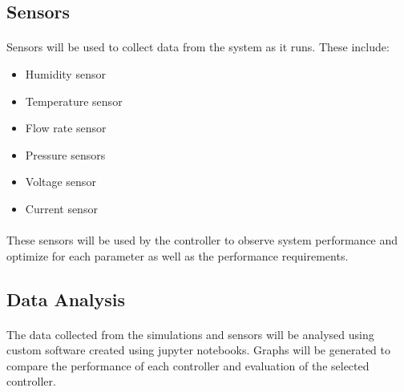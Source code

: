 \subsection{Sensors}
\paragraph{}Sensors will be used to collect data from the system as it runs. These include:
\begin{itemize}
\item Humidity sensor
\item Temperature sensor
\item Flow rate sensor
\item Pressure sensors
\item Voltage sensor
\item Current sensor
\end{itemize}
\paragraph{}These sensors will be used by the controller to observe system performance and optimize for each parameter as well as the performance requirements.
\subsection{Data Analysis}
\paragraph{}The data collected from the simulations and sensors will be analysed using custom software created using jupyter notebooks. Graphs will  be generated to compare the performance of each controller and evaluation of the selected controller.